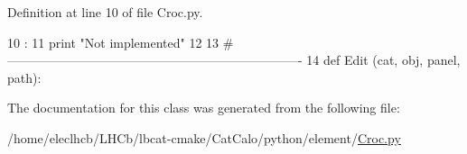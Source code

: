 Definition at line 10 of file Croc.py.


\begin{DoxyCode}
10                     :
11         print "Not implemented"
12 
13 #----------------------------------------------------------------------
14 
def Edit (cat, obj, panel, path):
\end{DoxyCode}


The documentation for this class was generated from the following file:\begin{DoxyCompactItemize}
\item 
/home/eleclhcb/LHCb/lbcat-\/cmake/CatCalo/python/element/\hyperlink{Croc_8py}{Croc.py}\end{DoxyCompactItemize}
